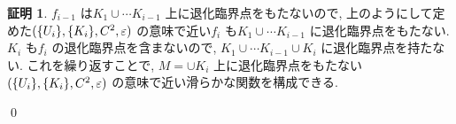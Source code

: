 \documentclass[10pt, fleqn, label-section=none]{bxjsarticle}
\theoremstyle{definition}
\newtheorem*{pf*}{証明}
\newcommand{\veps}{\varepsilon}
\newcommand{\cbra}[1]{\mleft\{#1\mright\}}
\renewcommand{\;}{\, ; \,}
\begin{document}
\begin{pf*}
$f_{i-1}$ は$K_1 \cup \cdots K_{i-1}$ 上に退化臨界点をもたないので, 上のようにして定めた$(\cbra{U_i}, \cbra{K_i}, C^2, \veps)$ の意味で近い$f_i$ も$K_1 \cup \cdots K_{i-1}$ に退化臨界点をもたない. $K_i$ も$f_i$ の退化臨界点を含まないので, $K_1 \cup \cdots K_{i-1} \cup K_i$ に退化臨界点を持たない. これを繰り返すことで, $M = \cup K_i$ 上に退化臨界点をもたない $(\cbra{U_i}, \cbra{K_i}, C^2, \veps)$ の意味で近い滑らかな関数を構成できる. 

\qed
\end{pf*}
\end{document}
